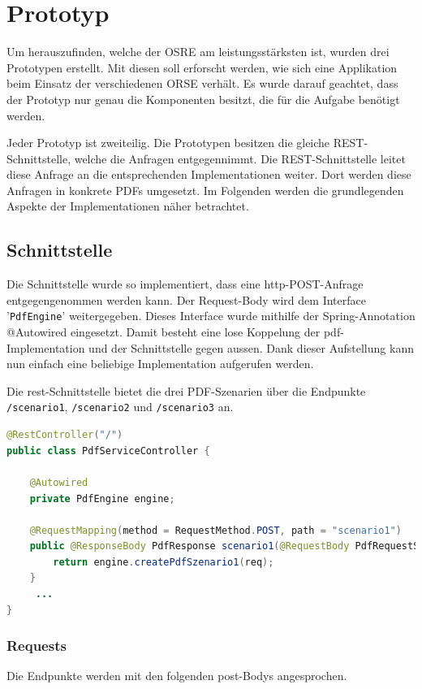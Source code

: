 \documentclass[main.tex]{subfiles}
\begin{document}
\chapter{Prototyp}
Um herauszufinden, welche der OSRE am leistungsstärksten ist, wurden drei Prototypen erstellt. Mit diesen soll erforscht werden, wie sich eine Applikation beim Einsatz der verschiedenen ORSE verhält. Es wurde darauf geachtet, dass der Prototyp nur genau die Komponenten besitzt, die für die Aufgabe benötigt werden.  

Jeder Prototyp ist zweiteilig. Die Prototypen besitzen die gleiche REST-Schnittstelle, welche die Anfragen entgegennimmt. Die REST-Schnittstelle leitet diese Anfrage an die entsprechenden Implementationen weiter. Dort werden diese Anfragen in konkrete PDFs umgesetzt. Im Folgenden werden die grundlegenden Aspekte der Implementationen näher betrachtet. 


\section{Schnittstelle}


Die Schnittstelle wurde so implementiert, dass eine \acrshort{http}-POST-Anfrage entgegengenommen werden kann. Der Request-Body wird dem Interface '\texttt{PdfEngine}' weitergegeben. Dieses Interface wurde mithilfe der Spring-Annotation @Autowired eingesetzt. Damit besteht eine lose Koppelung der \acrshort{pdf}-Implementation und der Schnittstelle gegen aussen. Dank dieser Aufstellung kann nun einfach eine beliebige Implementation aufgerufen werden.

Die \acrshort{rest}-Schnittstelle bietet die drei PDF-Szenarien über die Endpunkte \texttt{/scenario1}, \texttt{/scenario2} und \texttt{/scenario3} an.   

\begin{lstlisting}[language=Java]
@RestController("/")
public class PdfServiceController {

	@Autowired
	private PdfEngine engine;

	@RequestMapping(method = RequestMethod.POST, path = "scenario1")
	public @ResponseBody PdfResponse scenario1(@RequestBody PdfRequestScenario1 req) {
		return engine.createPdfSzenario1(req);
	}
     ...
}
\end{lstlisting}

\subsection{Requests}
Die Endpunkte werden mit den folgenden \gls{post}-Bodys angesprochen. 
\end{document}
